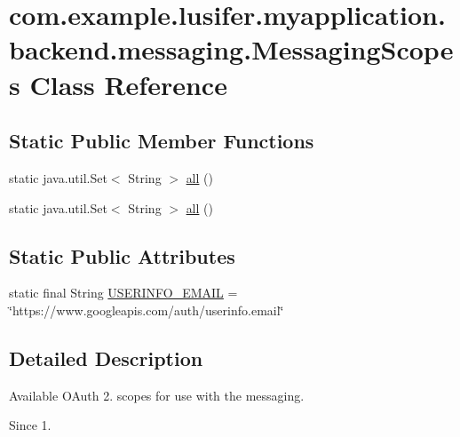\hypertarget{classcom_1_1example_1_1lusifer_1_1myapplication_1_1backend_1_1messaging_1_1_messaging_scopes}{}\section{com.\+example.\+lusifer.\+myapplication.\+backend.\+messaging.\+Messaging\+Scopes Class Reference}
\label{classcom_1_1example_1_1lusifer_1_1myapplication_1_1backend_1_1messaging_1_1_messaging_scopes}
\subsection*{Static Public Member Functions}
\begin{DoxyCompactItemize}
\item 
static java.\+util.\+Set$<$ String $>$ \hyperlink{classcom_1_1example_1_1lusifer_1_1myapplication_1_1backend_1_1messaging_1_1_messaging_scopes_a7414200f95cf8893670c50a6bf587ef2}{all} ()
\item 
static java.\+util.\+Set$<$ String $>$ \hyperlink{classcom_1_1example_1_1lusifer_1_1myapplication_1_1backend_1_1messaging_1_1_messaging_scopes_a7414200f95cf8893670c50a6bf587ef2}{all} ()
\end{DoxyCompactItemize}
\subsection*{Static Public Attributes}
\begin{DoxyCompactItemize}
\item 
static final String \hyperlink{classcom_1_1example_1_1lusifer_1_1myapplication_1_1backend_1_1messaging_1_1_messaging_scopes_a2356e72a6d956bb15f7c6317c83e536a}{U\+S\+E\+R\+I\+N\+F\+O\+\_\+\+E\+M\+A\+I\+L} = \char`\"{}https\+://www.\+googleapis.\+com/auth/userinfo.\+email\char`\"{}
\end{DoxyCompactItemize}


\subsection{Detailed Description}
Available O\+Auth 2. scopes for use with the messaging.

\begin{DoxySince}{Since}
1. 
\end{DoxySince}


